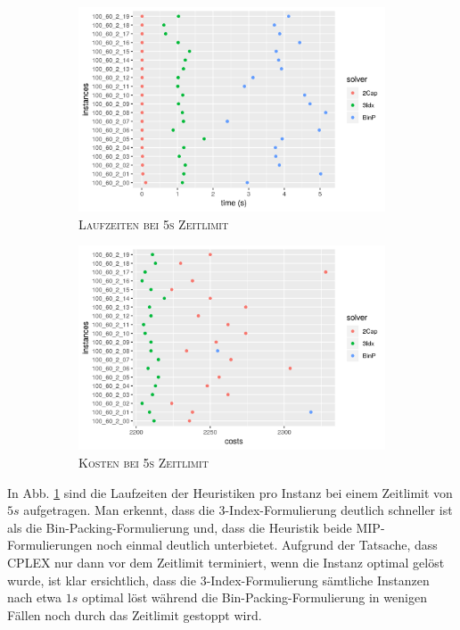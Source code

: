 \begin{figure}[H]
\centering
\begin{subfigure}[b]{0.4\textwidth}
\centering
\includegraphics[width=1.3\textwidth]{img/solver_instance_time_b=2_s_5s.png}
\caption{\textsc{Laufzeiten bei 5s Zeitlimit}}
\label{fig:b=2_s_runtimes}
\end{subfigure}
\hfill
\begin{subfigure}[b]{0.4\textwidth}
\centering
\includegraphics[width=1.3\textwidth]{img/solver_instance_cost_b=2_s_5s.png}
\caption{\textsc{Kosten bei 5s Zeitlimit}}
\label{fig:b=2_s_costs}
\end{subfigure}
\caption{}
\end{figure}

In Abb. \ref{fig:b=2_s_runtimes} sind die Laufzeiten der Heuristiken pro Instanz bei einem Zeitlimit von $5s$ aufgetragen. Man erkennt, dass
die 3-Index-Formulierung deutlich schneller ist als die Bin-Packing-Formulierung und, dass die Heuristik beide MIP-Formulierungen noch einmal deutlich unterbietet. Aufgrund der Tatsache, dass CPLEX nur dann vor dem Zeitlimit terminiert, wenn die Instanz optimal gelöst wurde, ist klar
ersichtlich, dass die 3-Index-Formulierung sämtliche Instanzen nach etwa $1s$ optimal löst während die Bin-Packing-Formulierung in wenigen Fällen noch durch das Zeitlimit gestoppt wird.

